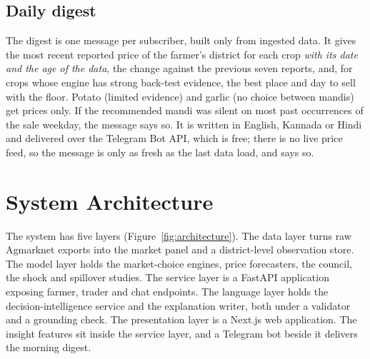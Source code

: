 \subsection{Daily digest}
\label{sec:digest-method}

The digest is one message per subscriber, built only from ingested data. It gives the most recent reported price of the farmer's district for each crop \emph{with its date and the age of the data}, the change against the previous seven reports, and, for crops whose engine has strong back-test evidence, the best place and day to sell with the floor. Potato (limited evidence) and garlic (no choice between mandis) get prices only. If the recommended mandi was silent on most past occurrences of the sale weekday, the message says so. It is written in English, Kannada or Hindi and delivered over the Telegram Bot API, which is free; there is no live price feed, so the message is only as fresh as the last data load, and says so.


\section{System Architecture}
\label{sec:architecture}

The system has five layers (Figure~\ref{fig:architecture}). The data layer turns raw Agmarknet exports into the market panel and a district-level observation store. The model layer holds the market-choice engines, price forecasters, the council, the shock and spillover studies. The service layer is a FastAPI application exposing farmer, trader and chat endpoints. The language layer holds the decision-intelligence service and the explanation writer, both under a validator and a grounding check. The presentation layer is a Next.js web application. The insight features sit inside the service layer, and a Telegram bot beside it delivers the morning digest.

